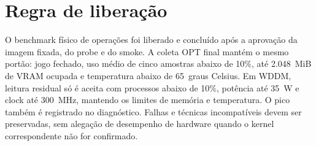 \section{Regra de liberação}







O benchmark físico de operações foi liberado e concluído após a aprovação da
imagem fixada, do probe e do smoke. A coleta OPT final mantém o mesmo portão: jogo
fechado, uso médio de cinco amostras abaixo de 10\%, até 2.048~MiB de VRAM ocupada
e temperatura abaixo de 65~graus Celsius. Em WDDM, leitura residual só é aceita
com processos abaixo de 10\%, potência até 35~W e clock até 300~MHz, mantendo os
limites de memória e temperatura. O pico também é registrado no diagnóstico.
Falhas e técnicas incompatíveis devem ser preservadas, sem alegação de desempenho
de hardware quando o kernel correspondente não for confirmado.
